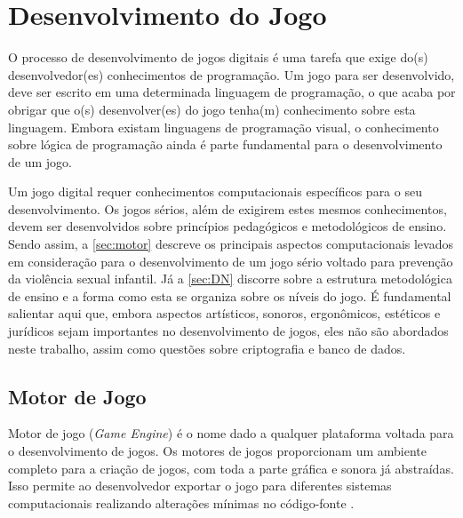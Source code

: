 \chapter{Desenvolvimento do Jogo}\label{ch:Desenvolvimento}


O processo de desenvolvimento de jogos digitais é uma tarefa que exige do(s) desenvolvedor(es) conhecimentos de programação. Um jogo para ser desenvolvido, deve ser escrito em uma determinada linguagem de programação, o que acaba por obrigar que o(s) desenvolver(es) do jogo tenha(m) conhecimento sobre esta linguagem. Embora existam linguagens de programação visual, o conhecimento sobre lógica de programação ainda é parte fundamental para o desenvolvimento de um jogo. 


Um jogo digital requer conhecimentos computacionais específicos para o seu desenvolvimento. Os jogos sérios, além de exigirem estes mesmos conhecimentos, devem ser desenvolvidos sobre princípios pedagógicos e metodológicos de ensino. Sendo assim, a \autoref{sec:motor} descreve os principais aspectos computacionais levados em consideração para o desenvolvimento de um jogo sério voltado para prevenção da violência sexual infantil. Já a \autoref{sec:DN} discorre sobre a estrutura metodológica de ensino e a forma como esta se organiza sobre os níveis do jogo. É fundamental salientar aqui que, embora aspectos artísticos, sonoros, ergonômicos, estéticos e jurídicos sejam importantes no desenvolvimento de jogos, eles não são abordados neste trabalho, assim como questões sobre criptografia e banco de dados.








\section{Motor de Jogo}\label{sec:motor}

Motor de jogo (\textit{Game Engine}) é o nome dado a qualquer plataforma voltada para o desenvolvimento de jogos. Os motores de jogos proporcionam um ambiente completo para a criação de jogos, com toda a parte gráfica e sonora já abstraídas. Isso permite ao desenvolvedor exportar o jogo para diferentes sistemas computacionais realizando alterações mínimas no código-fonte \cite{bishop1998designing, machado2009serious}. 

